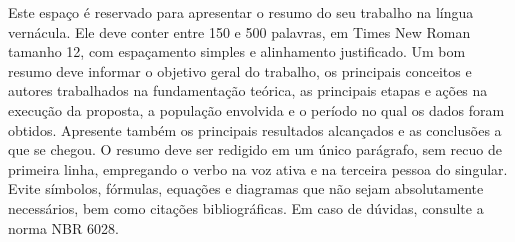 
\begin{resumo}
Este espaço é reservado para apresentar o resumo do seu trabalho na língua
vernácula. Ele deve conter entre 150 e 500 palavras, em Times New Roman
tamanho 12, com espaçamento simples e alinhamento justificado. Um bom resumo
deve informar o objetivo geral do trabalho, os principais conceitos e autores
trabalhados na fundamentação teórica, as principais etapas e ações na execução
da proposta, a população envolvida e o período no qual os dados foram obtidos.
Apresente também os principais resultados alcançados e as conclusões a que se
chegou. O resumo deve ser redigido em um único parágrafo, sem recuo de primeira
linha, empregando o verbo na voz ativa e na terceira pessoa do singular. Evite
símbolos, fórmulas, equações e diagramas que não sejam absolutamente
necessários, bem como citações bibliográficas. Em caso de dúvidas, consulte a
norma NBR 6028.
\end{resumo}
